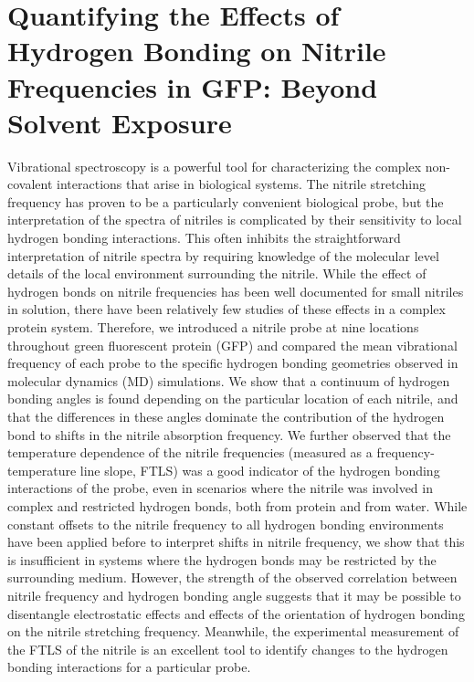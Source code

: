 \chapter{Quantifying the Effects of Hydrogen Bonding on Nitrile Frequencies in GFP: Beyond Solvent Exposure}\label{gfp-hbond}

Vibrational spectroscopy is a powerful tool for characterizing the complex non-covalent interactions that arise in biological systems.
The nitrile stretching frequency has proven to be a particularly convenient biological probe, but the interpretation of the spectra of nitriles is complicated by their sensitivity to local hydrogen bonding interactions.
This often inhibits the straightforward interpretation of nitrile spectra by requiring knowledge of the molecular level details of the local environment surrounding the nitrile.
While the effect of hydrogen bonds on nitrile frequencies has been well documented for small nitriles in solution, there have been relatively few studies of these effects in a complex protein system.
Therefore, we introduced a nitrile probe at nine locations throughout green fluorescent protein (GFP) and compared the mean vibrational frequency of each probe to the specific hydrogen bonding geometries observed in molecular dynamics (MD) simulations.
We show that a continuum of hydrogen bonding angles is found depending on the particular location of each nitrile, and that the differences in these angles dominate the contribution of the hydrogen bond to shifts in the nitrile absorption frequency.
We further observed that the temperature dependence of the nitrile frequencies (measured as a frequency-temperature line slope, FTLS) was a good indicator of the hydrogen bonding interactions of the probe, even in scenarios where the nitrile was involved in complex and restricted hydrogen bonds, both from protein and from water.
While constant offsets to the nitrile frequency to all hydrogen bonding environments have been applied before to interpret shifts in nitrile frequency, we show that this is insufficient in systems where the hydrogen bonds may be restricted by the surrounding medium.
However, the strength of the observed correlation between nitrile frequency and hydrogen bonding angle suggests that it may be possible to disentangle electrostatic effects and effects of the orientation of hydrogen bonding on the nitrile stretching frequency.
Meanwhile, the experimental measurement of the FTLS of the nitrile is an excellent tool to identify changes to the hydrogen bonding interactions for a particular probe.

